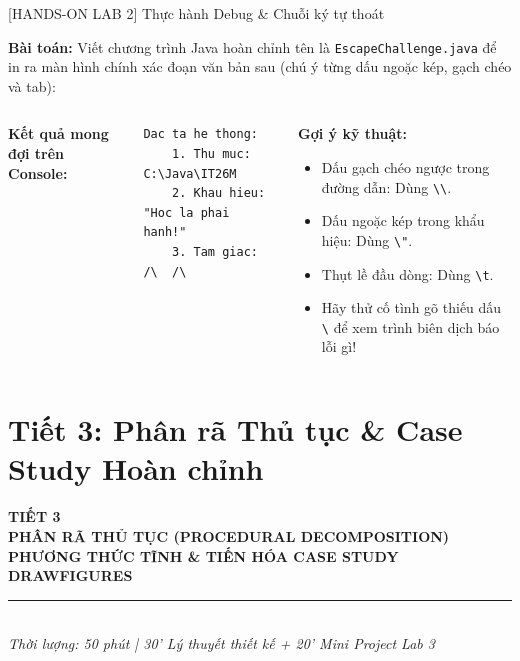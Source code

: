 \documentclass[aspectratio=169, 10pt]{beamer}
\begin{document}
\begin{frame}[fragile]{[HANDS-ON LAB 2] Thực hành Debug \& Chuỗi ký tự thoát}
  \begin{tcolorbox}[colback=white,colframe=UniBlue,title=\textbf{Thử thách thực hành Tiết 2 (Thời gian: 15 phút -- Trực tiếp trên máy tính)}]
    \small
    \textbf{Bài toán:} Viết chương trình Java hoàn chỉnh tên là \texttt{EscapeChallenge.java} để in ra màn hình chính xác đoạn văn bản sau (chú ý từng dấu ngoặc kép, gạch chéo và tab):
  \end{tcolorbox}

  \begin{columns}
    \textbf{Kết quả mong đợi trên Console:}
    \begin{lstlisting}[style=terminalStyle]
Dac ta he thong:
    1. Thu muc: C:\Java\IT26M
    2. Khau hieu: "Hoc la phai hanh!"
    3. Tam giac: /\  /\
    \end{lstlisting}

    \begin{exampleblock}{\textbf{Gợi ý kỹ thuật:}}
      \begin{itemize}\footnotesize
        \item Dấu gạch chéo ngược trong đường dẫn: Dùng \texttt{\textbackslash\textbackslash}.
        \item Dấu ngoặc kép trong khẩu hiệu: Dùng \texttt{\textbackslash"}.
        \item Thụt lề đầu dòng: Dùng \texttt{\textbackslash t}.
        \item Hãy thử cố tình gõ thiếu dấu \texttt{\textbackslash} để xem trình biên dịch báo lỗi gì!
      \end{itemize}
    \end{exampleblock}
  \end{columns}
\end{frame}

\section{Tiết 3: Phân rã Thủ tục \& Case Study Hoàn chỉnh}

\begin{frame}[plain]
  \begin{center}
    \vspace{1.5cm}
    {\Huge \textcolor{UniNavy}{\textbf{TIẾT 3}}}\\[4mm]
    {\Large \textbf{PHÂN RÃ THỦ TỤC (PROCEDURAL DECOMPOSITION)}}\\[2mm]
    {\large \textbf{PHƯƠNG THỨC TĨNH \& TIẾN HÓA CASE STUDY DRAWFIGURES}}\\[6mm]
    \rule{0.5\textwidth}{1pt}\\[4mm]
    \textit{\small Thời lượng: 50 phút | 30' Lý thuyết thiết kế + 20' Mini Project Lab 3}
  \end{center}
\end{frame}
\end{document}
